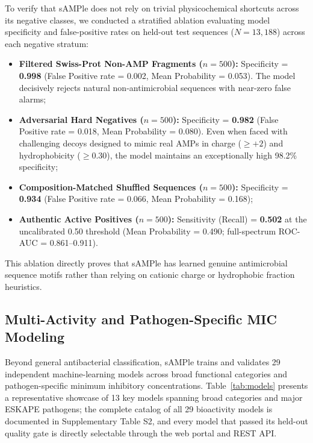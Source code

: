 \documentclass[unnumsec,webpdf,contemporary,large]{oup-authoring-template}%
\begin{document}
To verify that sAMPle does not rely on trivial physicochemical shortcuts across its negative classes, we conducted a stratified ablation evaluating model specificity and false-positive rates on held-out test sequences ($N=13,188$) across each negative stratum:
\begin{itemize}
    \item \textbf{Filtered Swiss-Prot Non-AMP Fragments ($n=500$):} Specificity = \textbf{0.998} (False Positive rate = 0.002, Mean Probability = 0.053). The model decisively rejects natural non-antimicrobial sequences with near-zero false alarms;
    \item \textbf{Adversarial Hard Negatives ($n=500$):} Specificity = \textbf{0.982} (False Positive rate = 0.018, Mean Probability = 0.080). Even when faced with challenging decoys designed to mimic real AMPs in charge ($\ge +2$) and hydrophobicity ($\ge 0.30$), the model maintains an exceptionally high 98.2\% specificity;
    \item \textbf{Composition-Matched Shuffled Sequences ($n=500$):} Specificity = \textbf{0.934} (False Positive rate = 0.066, Mean Probability = 0.168);
    \item \textbf{Authentic Active Positives ($n=500$):} Sensitivity (Recall) = \textbf{0.502} at the uncalibrated 0.50 threshold (Mean Probability = 0.490; full-spectrum ROC-AUC = 0.861--0.911).
\end{itemize}
This ablation directly proves that sAMPle has learned genuine antimicrobial sequence motifs rather than relying on cationic charge or hydrophobic fraction heuristics.

\subsection{Multi-Activity and Pathogen-Specific MIC Modeling}

Beyond general antibacterial classification, sAMPle trains and validates 29 independent machine-learning models across broad functional categories and pathogen-specific minimum inhibitory concentrations. Table~\ref{tab:models} presents a representative showcase of 13 key models spanning broad categories and major ESKAPE pathogens; the complete catalog of all 29 bioactivity models is documented in Supplementary Table S2, and every model that passed its held-out quality gate is directly selectable through the web portal and REST API.
\end{document}
